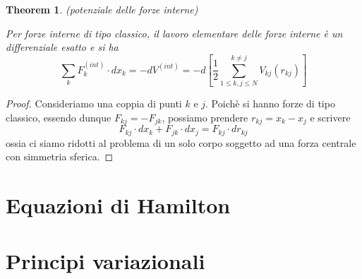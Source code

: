\documentclass{article}
\newtheorem{theorem}{Theorem}[section]
\begin{document}
            \begin{theorem}(potenziale delle forze interne)
                \label{thm:potenziale delle forze interne}

                Per forze interne di tipo classico, il lavoro elementare delle forze interne è un differenziale esatto e si ha 
                \[ \sum_k F_k^{(int)} \cdot dx_k = -dV^{(int)} = -d[\frac{1}{2} \sum_{1 \leq k, j \leq N}^{k \neq j} V_{kj}(r_{kj})] \]

            \end{theorem}
            \begin{proof}

                Consideriamo una coppia di punti $k$ e $j$. Poichè si hanno forze di tipo classico, essendo dunque $F_{kj} = - F_{jk}$, 
                possiamo prendere $r_{kj} = x_k - x_j$ e scrivere \[ F_{kj} \cdot dx_k + F_{jk} \cdot dx_j = F_{kj} \cdot dr_{kj} \]
                ossia ci siamo ridotti al problema di un solo corpo soggetto ad una forza centrale con simmetria sferica.

            \end{proof}

    \clearpage
    \section{Equazioni di Hamilton}

    \clearpage
    \section{Principi variazionali}
\end{document}
